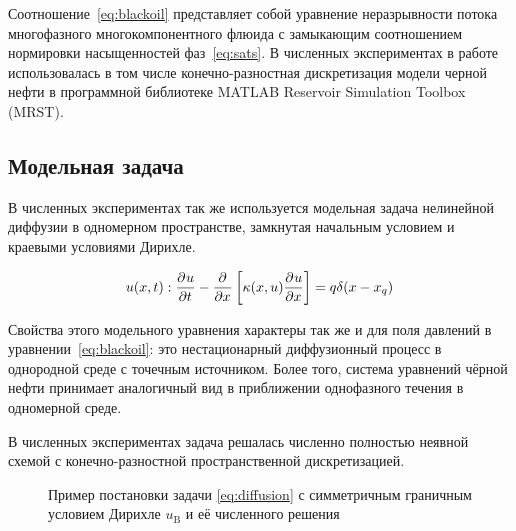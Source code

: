 Соотношение~\ref{eq:blackoil} представляет собой уравнение неразрывности потока многофазного многокомпонентного флюида с замыкающим соотношением нормировки насыщенностей фаз~\ref{eq:sats}.
В численных экспериментах в работе использовалась в том числе конечно-разностная дискретизация модели черной нефти в программной библиотеке MATLAB Reservoir Simulation Toolbox (MRST).

\subsection{Модельная задача}

В численных экспериментах так же используется модельная задача нелинейной диффузии в одномерном пространстве, замкнутая начальным условием и краевыми условиями Дирихле.

\begin{equation} \label{eq:diffusion}
   u(x,t): \frac{\partial^{} u}{\partial t^{}} - \frac{\partial^{} }{\partial x^{}} \left[\kappa(x, u) \frac{\partial^{} u}{\partial x^{}} \right]= q \delta (x - x_q)
\end{equation}

Свойства этого модельного уравнения характеры так же и для поля давлений в уравнении~\ref{eq:blackoil}: это нестационарный диффузионный процесс в однородной среде с точечным источником. Более того, система уравнений чёрной нефти принимает аналогичный вид в приближении однофазного течения в одномерной среде.

В численных экспериментах задача решалась численно полностью неявной схемой с конечно-разностной пространственной дискретизацией.

\begin{figure}[ht]
    \caption{Пример постановки задачи \ref{eq:diffusion} с симметричным граничным условием Дирихле $u_\text{B}$ и её численного решения \cite{Elizarev2022}}\label{fig:FOM}
\end{figure}


